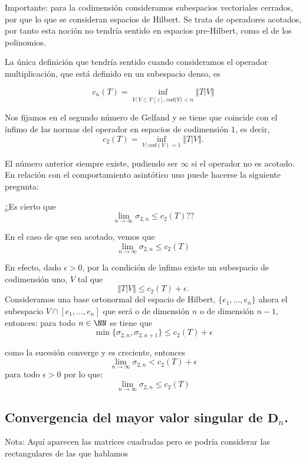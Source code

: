 \documentclass[12pt,a4paper]{article}
\begin{document}
\noindent Importante: para la codimensión consideramos subespacios vectoriales cerrados, por que lo que se consideran espacios de Hilbert. Se trata de operadores acotados, por tanto esta noción no tendría sentido en espacios pre-Hilbert, como el de los polinomios. 

\noindent La única definición que tendría sentido cuando consideramos el operador multiplicación, que está definido en un subespacio denso, es 

$$
c_n(T)=\inf_{V: V\subset \mathbb{P}[z], cod(\overline{V)}<n} \Vert T\vert V \Vert 
$$


\noindent Nos fijamos en el segundo n\'{u}mero de Gelfand y se tiene que coincide con el \'{i}nfimo de las normas del operador en espacios de codimensi\'{o}n $1$, es decir, 
$$
c_{2}(T)=\inf_{V: cod(V)=1} \Vert T\vert V \Vert .
$$ 


\noindent El n\'{u}mero anterior siempre existe, pudiendo ser $\infty$ si el operador no es acotado. 
\noindent En relaci\'{o}n con el comportamiento asint\'{o}tico uno puede hacerse la siguiente pregunta: 




 ¿Es cierto que 
$$
\lim_{n\to \infty} \sigma_{2,n} \leq c_{2}(T) ??
$$

\noindent En el caso de que sea acotado, vemos que 
$$
\lim_{n\to \infty} \sigma_{2,n} \leq c_{2}(T)
$$

\noindent En efecto, dado $\epsilon>0$,  por la condici\'{o}n de \'{\i}nfimo existe un subespacio de codimensi\'{o}n uno, $V$ tal que 
$$
\Vert T \vert V \Vert \leq c_{2}(T)+\epsilon .
$$
\noindent Consideramos una base ortonormal del espacio de Hilbert, $\{e_1,\dots,e_n\}$ ahora el subespacio $V\cap [e_1,\dots,e_n]$ que ser\'{a} o de dimensi\'{o}n $n$ o de dimensi\'{o}n $n-1$, entonces: para todo $n\in \NN$ se tiene que  
$$
\min \{\sigma_{2,n},\sigma_{2,n+1} \} \leq c_{2}(T)+\epsilon
$$


\noindent como la sucesi\'{o}n converge y es creciente, entonces 
$$
\lim_{n\to \infty} \sigma_{2,n} < c_{2}(T)+\epsilon
$$
\noindent para todo $\epsilon >0$ por lo que: 
$$
\lim_{n\to \infty} \sigma_{2,n} \leq c_2(T)
$$

\noindent 
\subsection{Convergencia del mayor valor singular de $\mathbf{D}_n$.} 



\noindent Nota: Aquí aparecen las matrices cuadradas pero se podría considerar las rectangulares de las que hablamos 
\end{document}

